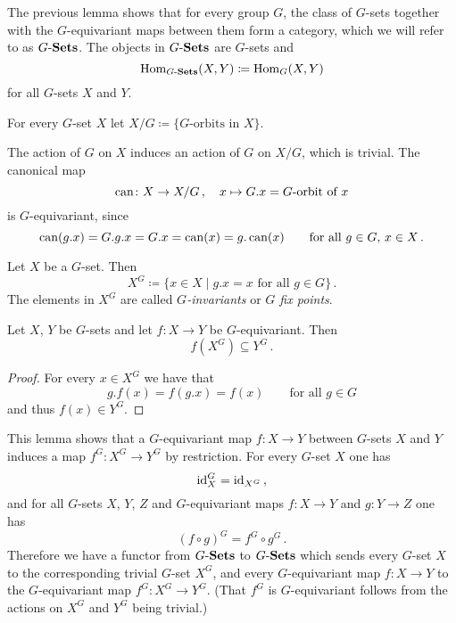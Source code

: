The previous lemma shows that for every group $G$, the class of $G$-sets together with the $G$-equivariant maps between them form a category, which we will refer to as $G\text{-}\mathbf{Sets}$.
The objects in $G\text{-}\mathbf{Sets}$ are $G$-sets and
\[
            \operatorname{Hom}_{G\text{-}\mathbf{Sets}}(X,Y)
  \coloneqq \operatorname{Hom}_G(X,Y)
\]
for all $G$-sets $X$ and $Y$.


\begin{defi}
  For every $G$-set $X$ let $X/G \coloneqq \{ \text{$G$-orbits in $X$} \}$.
\end{defi}


\begin{note}
  The action of $G$ on $X$ induces an action of $G$ on $X/G$, which is trivial.
  The canonical map
  \[
            \operatorname{can}
    \colon  X \to X/G \,,
    \quad   x
    \mapsto G.x
    =       \text{$G$-orbit of $x$}
  \]
  is $G$-equivariant, since
  \[
      \operatorname{can}(g.x)
    = G.g.x
    = G.x
    = \operatorname{can}(x)
    = g.\operatorname{can}(x)
    \qquad
    \text{for all $g \in G$, $x \in X$} \,.
  \]
\end{note}


\begin{defi}
  Let $X$ be a $G$-set.
  Then
  \[
              X^G
    \coloneqq \{
                x \in X
              \mid
                \text{$g.x = x$ for all $g \in G$}
              \} \,.
  \]
  The elements in $X^G$ are called \emph{$G$-invariants} or \emph{$G$ fix points}.
\end{defi}


\begin{lem}
  Let $X$, $Y$ be $G$-sets and let $f \colon X \to Y$ be $G$-equivariant.
  Then
  \[
              f\left( X^G \right)
    \subseteq Y^G \,.
  \]
\end{lem}
\begin{proof}
  For every $x \in X^G$ we have that
  \[
      g.f(x)
    = f(g.x)
    = f(x)
    \qquad
    \text{for all $g \in G$}
  \]
  and thus $f(x) \in Y^G$.
\end{proof}


This lemma shows that a $G$-equivariant map $f \colon X \to Y$ between $G$-sets $X$ and $Y$ induces a map $f^G \colon X^G \to Y^G$ by restriction.
For every $G$-set $X$ one has
\[
    \operatorname{id}_X^G
  = \operatorname{id}_{X^G} \,,
\]
and for all $G$-sets $X$, $Y$, $Z$ and $G$-equivariant maps $f \colon X \to Y$ and $g \colon Y \to Z$ one has
\[
    (f \circ g)^G
  = f^G \circ g^G \,.
\]
Therefore we have a functor from $G\text{-}\mathbf{Sets}$ to $G\text{-}\mathbf{Sets}$ which sends every $G$-set $X$ to the corresponding trivial $G$-set $X^G$, and every $G$-equivariant map $f \colon X \to Y$ to the $G$-equivariant map $f^G \colon X^G \to Y^G$.
(That $f^G$ is $G$-equivariant follows from the actions on $X^G$ and $Y^G$ being trivial.)


